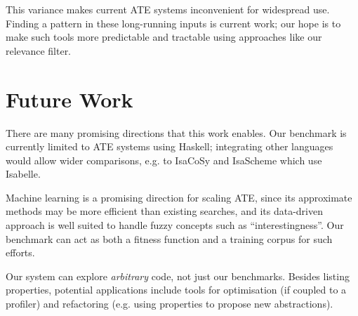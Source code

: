 \documentclass[]{default}
\begin{document}
This variance makes current ATE systems inconvenient for widespread use. Finding
a pattern in these long-running inputs is current work; our hope is to make such
tools more predictable and tractable using approaches like our relevance filter.

\section{Future Work}\label{future-work}

There are many promising directions that this work enables. Our benchmark is
currently limited to ATE systems using Haskell; integrating other languages
would allow wider comparisons, e.g. to IsaCoSy and IsaScheme which use Isabelle.

Machine learning is a promising direction for scaling ATE, since its approximate
methods may be more efficient than existing searches, and its data-driven
approach is well suited to handle fuzzy concepts such as ``interestingness''.
Our benchmark can act as both a fitness function and a training corpus for such
efforts.

Our system can explore \emph{arbitrary} code, not just our benchmarks. Besides
listing properties, potential applications include tools for optimisation (if
coupled to a profiler) and refactoring (e.g. using properties to propose new
abstractions).



\end{document}
